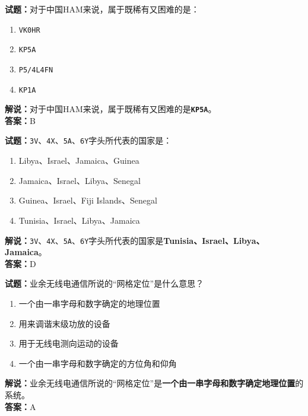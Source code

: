 \documentclass{ctexbook}
\begin{document}
\vspace{1em}

\textbf{试题：}对于中国HAM来说，属于既稀有又困难的是：
\begin{enumerate}[leftmargin=3em]
  \item \texttt{VK0HR}
  \item \texttt{KP5A}
  \item \texttt{P5/4L4FN} %
  \item \texttt{KP1A}
\end{enumerate}
\noindent\textbf{解说：}对于中国HAM来说，属于既稀有又困难的是\texttt{\textbf{KP5A}}。\\\noindent\textbf{答案：}B

\vspace{1em}

\textbf{试题：}\texttt{3V}、\texttt{4X}、\texttt{5A}、\texttt{6Y}字头所代表的国家是：
\begin{enumerate}[leftmargin=3em]
  \item Libya、Israel、Jamaica、Guinea
  \item Jamaica、Israel、Libya、Senegal
  \item Guinea、Israel、Fiji Islands、Senegal
  \item Tunisia、Israel、Libya、Jamaica %
\end{enumerate}
\noindent\textbf{解说：}\texttt{3V}、\texttt{4X}、\texttt{5A}、\texttt{6Y}字头所代表的国家是\textbf{Tunisia、Israel、Libya、Jamaica}。\\\noindent\textbf{答案：}D

\vspace{1em}

\textbf{试题：}业余无线电通信所说的“网格定位”是什么意思？
\begin{enumerate}[leftmargin=3em]
  \item 一个由一串字母和数字确定的地理位置 %
  \item 用来调谐末级功放的设备
  \item 用于无线电测向运动的设备
  \item 一个由一串字母和数字确定的方位角和仰角
\end{enumerate}
\noindent\textbf{解说：}业余无线电通信所说的“网格定位”是\textbf{一个由一串字母和数字确定地理位置}的系统。\\\noindent\textbf{答案：}A
\end{document}
